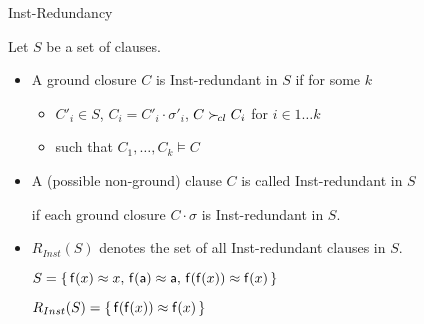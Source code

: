 \documentclass[%
handout,
]{beamer}
\begin{document}
\begin{frame}{Inst-Redundancy}

Let $S$ be a set of clauses.

\begin{itemize}
    \item A ground closure $C$ is Inst-redundant in $S$
    if for some $k$
    \begin{itemize}
        \item $C'_i\in S$, $C_i=C'_i\cdot\sigma'_i$, $C\mathrel\succ_{\!cl} C_i$ \hfill for $i\in 1\ldots k$
        \item such that $C_1,\ldots,C_k\models C$
    \end{itemize}
    \vspace{0.7em}
    \item
    A (possible non-ground) clause $C$ is called Inst-redundant in $S$

if each ground closure $C\cdot\sigma$ is Inst-redundant in $S$.

\vspace{0.7em}
\item
$R_{Inst}(S)$ denotes the set of all Inst-redundant clauses in $S$.

\vspace{0.7em}
\begin{example}
$S =
    \{\,
    \mathsf{f}(x)\approx x,\,
    \mathsf{f}(\mathsf{a})\approx \mathsf{a},\,
    \mathsf{f}(\mathsf{f}(x))\approx\mathsf{f}(x)
    \,\}$

$R_{Inst}(S) = \{\, \mathsf{f}(\mathsf{f}(x))\approx\mathsf{f}(x) \,\}$
\end{example}
\end{itemize}
\end{frame}
\end{document}
